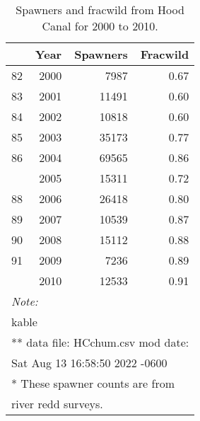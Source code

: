 \documentclass[
  letterpaper,
  oneside]{scrbook}
\begin{document}
\hypertarget{tbl-appB2}{}
\begin{table}
\caption{\label{tbl-appB2}Spawners and fracwild from Hood Canal for 2000 to 2010. }\tabularnewline

\centering
\begin{tabular}[t]{lrrr}
\toprule
  & Year & Spawners & Fracwild\\
\midrule
82 & 2000 & 7987 & 0.67\\
83 & 2001 & 11491 & 0.60\\
84 & 2002 & 10818 & 0.60\\
85 & 2003 & 35173 & 0.77\\
86 & 2004 & 69565 & 0.86\\
\addlinespace
87 & 2005 & 15311 & 0.72\\
88 & 2006 & 26418 & 0.80\\
89 & 2007 & 10539 & 0.87\\
90 & 2008 & 15112 & 0.88\\
91 & 2009 & 7236 & 0.89\\
\addlinespace
92 & 2010 & 12533 & 0.91\\
\bottomrule
\multicolumn{4}{l}{\rule{0pt}{1em}\textit{Note: }}\\
\multicolumn{4}{l}{\rule{0pt}{1em}kable}\\
\multicolumn{4}{l}{\textsuperscript{} ** data file: HCchum.csv mod date:}\\
\multicolumn{4}{l}{Sat Aug 13 16:58:50 2022 -0600}\\
\multicolumn{4}{l}{\textsuperscript{} * These spawner counts are from}\\
\multicolumn{4}{l}{river redd surveys.}\\
\end{tabular}
\end{table}

\newpage


\backmatter
\end{document}
